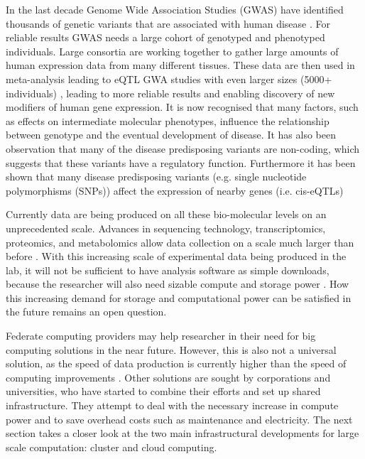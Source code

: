In the last decade Genome Wide Association Studies (GWAS) have identified thousands of genetic variants that are associated 
with human disease \cite{Hindorff:2009}. For reliable results GWAS needs a large cohort of genotyped and phenotyped individuals. 
Large consortia are working together to gather large amounts of human expression data from many different tissues. These data 
are then used in meta-analysis leading to eQTL GWA studies with even larger sizes (5000+ individuals) \cite{Lude:2011}, leading 
to more reliable results and enabling discovery of new modifiers of human gene expression. It is now recognised that many factors, 
such as effects on intermediate molecular phenotypes, influence the relationship between genotype and the eventual development 
of disease. It has also been observation that many of the disease predisposing variants are non-coding, which suggests that 
these variants have a regulatory function. Furthermore it has been shown that many disease predisposing variants (e.g. single 
nucleotide polymorphisms (SNPs)) affect the expression of nearby genes (i.e. cis-eQTLs) \cite{Zeller:2010, Lude:2011, Powell:2012}

Currently data are being produced on all these bio-molecular levels on an unprecedented scale. Advances in sequencing technology, 
transcriptomics, proteomics, and metabolomics allow data collection on a scale much larger than before \cite{Editorial:2009, Shah:2013}. 
With this increasing scale of experimental data being produced in the lab, it will not be sufficient to have analysis software as 
simple downloads, because the researcher will also need sizable compute and storage power \cite{Schadt:2010}. How this increasing 
demand for storage and computational power can be satisfied in the future remains an open question. 

Federate computing providers may help researcher in their need for big computing solutions in the near future. However, this is also 
not a universal solution, as the speed of data production is currently higher than the speed of computing improvements 
\cite{Moore:1998, Editorial:2009, Shah:2013}. Other solutions are sought by corporations and universities, who have started to combine 
their efforts and set up shared infrastructure. They attempt to deal with the necessary increase in compute power and to save 
overhead costs such as maintenance and electricity. The next section takes a closer look at the two main infrastructural developments 
for large scale computation: cluster and cloud computing.

